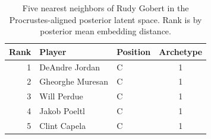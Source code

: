 \begin{table}[htbp]
  \centering\small
  \begin{tabular}{rllc}
    \toprule
    Rank & Player & Position & Archetype \\
    \midrule
    1 & DeAndre Jordan & C & 1 \\
    2 & Gheorghe Muresan & C & 1 \\
    3 & Will Perdue & C & 1 \\
    4 & Jakob Poeltl & C & 1 \\
    5 & Clint Capela & C & 1 \\
    \bottomrule
  \end{tabular}
  \caption{Five nearest neighbors of Rudy Gobert in the Procrustes-aligned posterior latent space. Rank is by posterior mean embedding distance.}
  \label{tab:Rudy_Gobert_neighbors}
\end{table}

